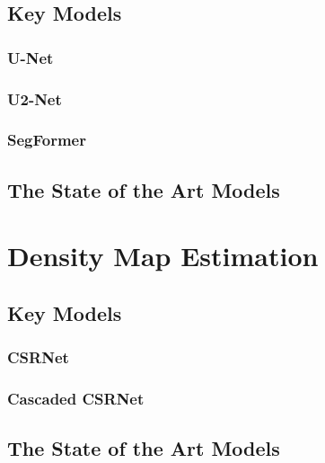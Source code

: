 \section{Key Models}
\subsection{U-Net}
\subsection{U2-Net}
\subsection{SegFormer}
\section{The State of the Art Models}

\chapter{Density Map Estimation}
\section{Key Models}
\subsection{CSRNet}
\subsection{Cascaded CSRNet}
\section{The State of the Art Models}